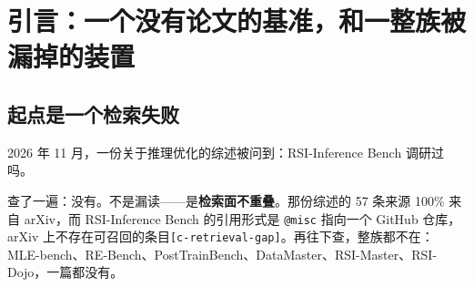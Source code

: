 \begin{abstract}
\textbf{第三，失败主要是「差一点」。} 同一个 agent 在同一批评测里，fail-to-pass 检查项通过率是 0.9006，而 pass@1 是 0.2667{\scriptsize\texttt{[c-\hspace{0pt}near-\hspace{0pt}miss-\hspace{0pt}gap]}}。也就是说它已经把九成的检查项做对，却因为剩下一成拿不到分。这不是能力的失败，是判据形状的选择——而基准作者是明确选择的（\texttt{A partial pass counts as a failure}）。


\textbf{第四，名字里有 RSI，但循环没闭合——缺的那一段正是「谁来判」。} 这一族已经能改进模型（PostTrainBench 系）与引擎（RSI-Inference Bench），但评测装置本身仍由人在循环外持有：没有一篇让 agent 去改「谁判它对」{\scriptsize\texttt{[c-\hspace{0pt}rsi-\hspace{0pt}not-\hspace{0pt}closed]}}。所有方法侧的进展——DataTree、Experiment OS、轨迹微调——都在把分数做高，没有一条在动判据{\scriptsize\texttt{[c-\hspace{0pt}method-\hspace{0pt}not-\hspace{0pt}judgment]}}。


\textbf{结论：这一族基准的判别力确实来自「判据能不能被独立重跑」，而这也正是它的天花板。} 能独立重跑的判据（起不起得来、快多少倍）已经被工程化到可批量执行，代价是每道题都要能重建环境{\scriptsize\texttt{[c-\hspace{0pt}apparatus-\hspace{0pt}cost]}}；而「这样改对不对」这类不能独立重跑的判据，至今没有一篇把它形式化。


\textbf{关键词}：ML 工程基准；day-0 模型支持；推理引擎；判据形状；验证装置；递归自我改进


\end{abstract}
\section{引言：一个没有论文的基准，和一整族被漏掉的装置}

\subsection{起点是一个检索失败}

2026 年 11 月，一份关于推理优化的综述被问到：RSI-Inference Bench 调研过吗。


查了一遍：没有。不是漏读——是\textbf{检索面不重叠}。那份综述的 57 条来源 100\% 来自 arXiv，而 RSI-Inference Bench 的引用形式是 \texttt{@misc} 指向一个 GitHub 仓库，arXiv 上不存在可召回的条目{\scriptsize\texttt{[c-\hspace{0pt}retrieval-\hspace{0pt}gap]}}。再往下查，整族都不在：MLE-bench、RE-Bench、PostTrainBench、DataMaster、RSI-Master、RSI-Dojo，一篇都没有。


